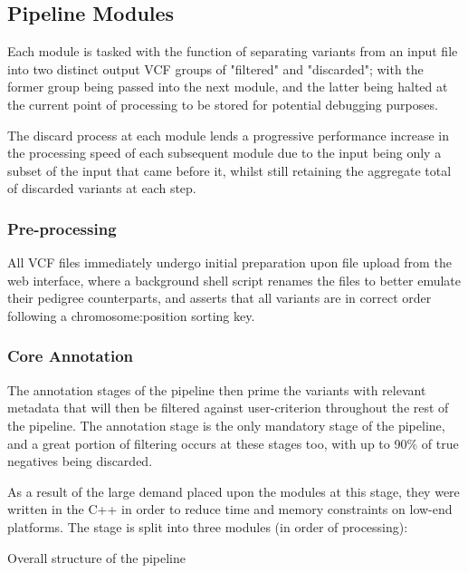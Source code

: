 \subsection{Pipeline Modules}

Each module is tasked with the function of separating variants from an input file into two distinct output VCF groups of "filtered" and "discarded"; with the former group being passed into the next module, and the latter being halted at the current point of processing to be stored for potential debugging purposes.

The discard process at each module lends a progressive performance increase in the processing speed of each subsequent module due to the input being only a subset of the input that came before it, whilst still retaining the aggregate total of discarded variants at each step.

\subsubsection{Pre-processing}

All VCF files immediately undergo initial preparation upon file upload from the web interface, where a background shell script renames the files to better emulate their pedigree counterparts, and asserts that all variants are in correct order following a chromosome:position sorting key.


\subsubsection{Core Annotation}

The annotation stages of the pipeline then prime the variants with relevant metadata that will then be filtered against user-criterion throughout the rest of the pipeline. The annotation stage is the only mandatory stage of the pipeline, and a great portion of filtering occurs at these stages too, with up to 90\% of true negatives being discarded.

As a result of the large demand placed upon the modules at this stage, they were written in the C++ in order to reduce time and memory constraints on low-end platforms. The stage is split into three modules (in order of processing): 

 {Overall structure of the \app pipeline}


